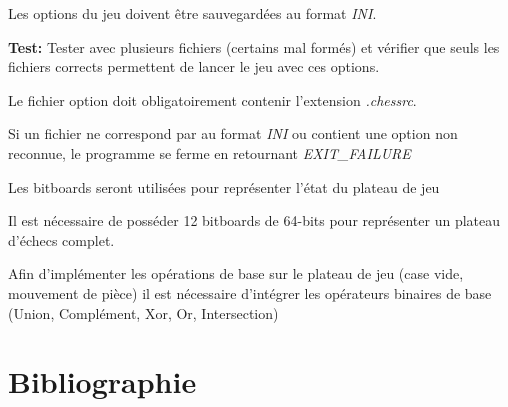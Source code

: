 \documentclass{article}
\begin{document}
\begin{nonfunctionnalneedbox}
    \begin{subneedbox}
        Les options du jeu doivent être sauvegardées au format \textit{INI}.

        \textbf{Test:} Tester avec plusieurs fichiers (certains mal formés) et vérifier 
        que seuls les fichiers corrects permettent de lancer le jeu avec ces options.
    \end{subneedbox}
    \begin{subneedbox}
        Le fichier option doit obligatoirement contenir l'extension \textit{.chessrc}.
    \end{subneedbox}
    \begin{subneedbox}
        Si un fichier ne correspond par au format \textit{INI} ou contient une 
        option non reconnue, le programme se ferme en retournant \textit{EXIT\_FAILURE}
    \end{subneedbox}
    
\end{nonfunctionnalneedbox}

\begin{needbox}
    Les bitboards seront utilisées pour représenter l'état du plateau de jeu
    \begin{subneedbox}
        Il est nécessaire de posséder 12 bitboards de 64-bits pour représenter un
        plateau d'échecs complet.  
    \end{subneedbox}
    \begin{subneedbox}
        Afin d'implémenter les opérations de base sur le plateau de jeu (case vide, mouvement de pièce)
        il est nécessaire d'intégrer les opérateurs binaires de base (Union, Complément, Xor, Or, Intersection) 
    \end{subneedbox}
    
\end{needbox}

\begin{needbox}
    
\end{needbox}

\begin{needbox}
    
\end{needbox}




\section{Bibliographie}


\end{document}
